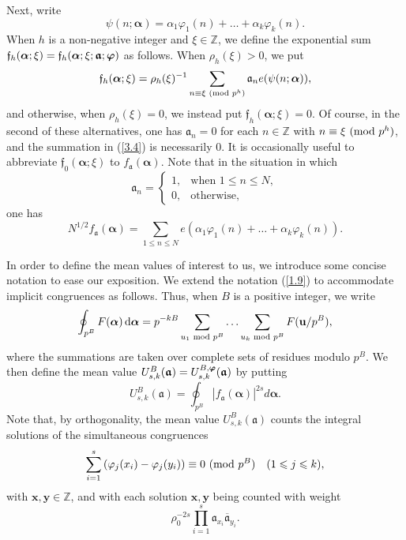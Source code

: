 \documentclass[12pt,reqno]{amsart}
\theoremstyle{definition}
\theoremstyle{remark}
\numberwithin{equation}{section}
\newcommand{\mmod}[1]{\,\,(\text{\rm mod}\,\,#1)}
\newcommand{\nmod}[1]{\,\,\text{\rm mod}\,\,#1}
\def\bfu{{\mathbf u}}
\def\bfx{{\mathbf x}}
\def\bfy{{\mathbf y}}
\def\dbZ{{\mathbb Z}}\def\dbQ{{\mathbb Q}}
\def\gra{{\mathfrak a}}\def\grA{{\mathfrak A}}\def\bfgra{{\boldsymbol \gra}}
\def\grf{{\mathfrak f}}\def\grF{{\mathfrak F}}
\def\alp{{\alpha}} \def\bfalp{{\boldsymbol \alpha}}
\def\le{\leqslant} \def\ge{\geqslant} \def\pleq{\preccurlyeq} \def\ple{\prec}
\def\d{{\,{\rm d}}}
\begin{document}
Next, write
\begin{equation}\label{3.3}
\psi(n;\bfalp)=\alp_1\varphi_1(n)+\ldots +\alp_k\varphi_k(n).
\end{equation}
When $h$ is a non-negative integer and $\xi\in \dbZ$, we define the exponential sum 
$\grf_h(\bfalp;\xi)=\grf_h(\bfalp;\xi;\bfgra;\bfvarphi)$ as follows. When $\rho_h(\xi)>0$, we 
put
\begin{equation}\label{3.4}
\grf_h(\bfalp;\xi)=\rho_h(\xi)^{-1}\sum_{n\equiv \xi\mmod{p^h}}\gra_ne(\psi(n;\bfalp)),
\end{equation}
and otherwise, when $\rho_h(\xi)=0$, we instead put $\grf_h(\bfalp;\xi)=0$. Of course, in 
the second of these alternatives, one has $\gra_n=0$ for each $n\in \dbZ$ with 
$n\equiv \xi\mmod{p^h}$, and the summation in (\ref{3.4}) is necessarily $0$. It is 
occasionally useful to abbreviate $\grf_0(\bfalp;\xi)$ to $f_\bfgra (\bfalp)$. Note that in 
the situation in which
$$\gra_n=\begin{cases} 1,&\text{when $1\le n\le N$},\\
0,&\text{otherwise},\end{cases}$$
one has
$$N^{1/2}f_\bfgra(\bfalp)=\sum_{1\le n\le N}e(\alp_1\varphi_1(n)+\ldots 
+\alp_k\varphi_k(n)).$$

\par In order to define the mean values of interest to us, we introduce some concise 
notation to ease our exposition. We extend the notation (\ref{1.9}) to accommodate implicit 
congruences as follows. Thus, when $B$ is a positive integer, we write
\begin{equation}\label{3.5}
\oint_{p^B}F(\bfalp)\d\bfalp =p^{-kB}\sum_{u_1\nmod{p^B}}\ldots 
\sum_{u_k\nmod{p^B}}F(\bfu/p^B),
\end{equation}
where the summations are taken over complete sets of residues modulo $p^B$. We then 
define the mean value $U_{s,k}^B(\bfgra)=U_{s,k}^{B,\bfvarphi}(\bfgra)$ by putting
\begin{equation}\label{3.6}
U_{s,k}^B(\bfgra)=\oint_{p^B}|f_\bfgra(\bfalp)|^{2s}d\bfalp .
\end{equation}
Note that, by orthogonality, the mean value $U_{s,k}^B(\bfgra)$ counts the integral 
solutions of the simultaneous congruences
\begin{equation}\label{3.7}
\sum_{i=1}^s\left( \varphi_j(x_i)-\varphi_j(y_i)\right) \equiv 0\mmod{p^B}\quad 
(1\le j\le k),
\end{equation}
with $\bfx,\bfy\in \dbZ$, and with each solution $\bfx,\bfy$ being counted with weight
$$\rho_0^{-2s}\prod_{i=1}^s\gra_{x_i}{\overline \gra_{y_i}}.$$
\end{document}
